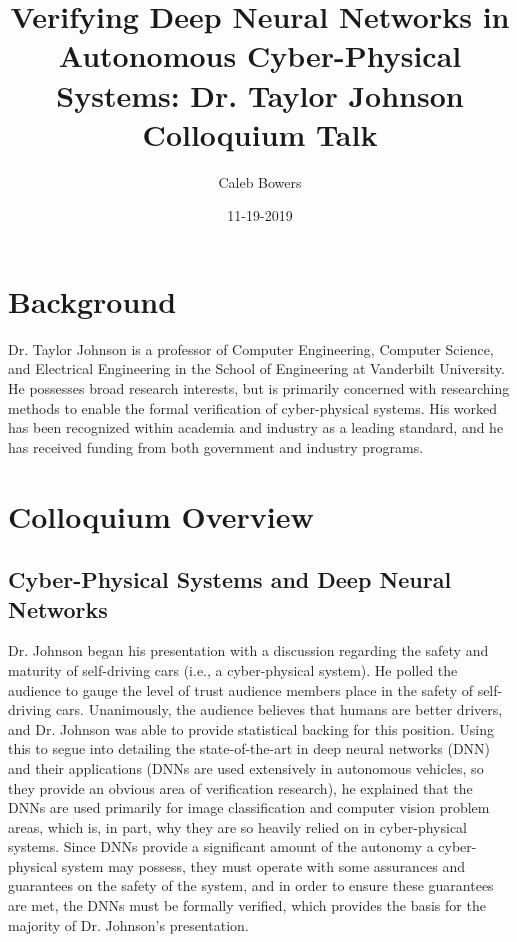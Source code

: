 \documentclass[10pt, journal]{IEEEtran}
\title{Verifying Deep Neural Networks in Autonomous Cyber-Physical Systems: Dr. Taylor Johnson Colloquium Talk}
\author{Caleb Bowers}
\date{11-19-2019}
\begin{document}
\maketitle

\section{Background}
Dr. Taylor Johnson is a professor of Computer Engineering, Computer Science, and Electrical Engineering in the School of Engineering at Vanderbilt University. He possesses broad research interests, but is primarily concerned with researching methods to enable the formal verification of cyber-physical systems. His worked has been recognized within academia and industry as a leading standard, and he has received funding from both government and industry programs.

\section{Colloquium Overview}
\subsection{Cyber-Physical Systems and Deep Neural Networks}
Dr. Johnson began his presentation with a discussion regarding the safety and maturity of self-driving cars (i.e., a cyber-physical system). He polled the audience to gauge the level of trust audience members place in the safety of self-driving cars. Unanimously, the audience believes that humans are better drivers, and Dr. Johnson was able to provide statistical backing for this position. Using this to segue into detailing the state-of-the-art in deep neural networks (DNN) and their applications (DNNs are used extensively in autonomous vehicles, so they provide an obvious area of verification research), he explained that the DNNs are used primarily for image classification and computer vision problem areas, which is, in part, why they are so heavily relied on in cyber-physical systems. Since DNNs provide a significant amount of the autonomy a cyber-physical system may possess, they must operate with some assurances and guarantees on the safety of the system, and in order to ensure these guarantees are met, the DNNs must be formally verified, which provides the basis for the majority of Dr. Johnson's presentation.
\end{document}
